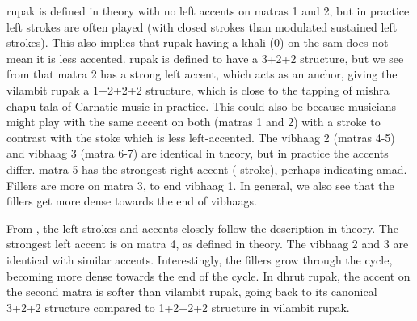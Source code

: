 \begin{description}[style=unboxed,leftmargin=0cm]
\item[\textbf{\Gls{vilambit} \gls{rupak}}:] \Gls{rupak} is defined in theory with no left accents on \glspl{matra} 1 and 2, but in practice left strokes are often played (with closed strokes than modulated sustained left strokes). This also implies that \gls{rupak} having a \gls{khali} (0) on the \gls{sam} does not mean it is less accented. \Gls{rupak} is defined to have a 3+2+2 structure, but we see from  that \gls{matra} 2 has a strong left accent, which acts as an anchor, giving the \gls{vilambit} \gls{rupak} a 1+2+2+2 structure, which is close to the tapping of \gls{mishra chapu} \gls{tala} of Carnatic music in practice. This could also be because musicians might play with the same accent on both  (\glspl{matra} 1 and 2) with a  stroke to contrast with the  stoke which is less left-accented. The \gls{vibhaag} 2 (\glspl{matra} 4-5) and \gls{vibhaag} 3 (\gls{matra} 6-7) are identical in theory, but in practice the accents differ. \Gls{matra} 5 has the strongest right accent ( stroke), perhaps indicating \gls{amad}. Fillers are more on \gls{matra} 3, to end \gls{vibhaag} 1. In general, we also see that the fillers get more dense towards the end of \glspl{vibhaag}. 
%
\item[\textbf{\Gls{madhyam} and \gls{dhrut} \gls{lay} \gls{rupak}}:] From , the left strokes and accents closely follow the description in theory. The strongest left accent is on \gls{matra} 4, as defined in theory. The \gls{vibhaag} 2 and 3 are identical with similar accents. Interestingly, the fillers grow through the cycle, becoming more dense towards the end of the cycle. In \gls{dhrut} \gls{rupak}, the accent on the second \gls{matra} is softer than \gls{vilambit} \gls{rupak}, going back to its canonical 3+2+2 structure compared to 1+2+2+2 structure in \gls{vilambit} \gls{rupak}. 
\end{description}
%
% 
